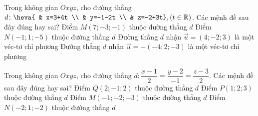 \begin{ex}%
	Trong không gian $Oxyz$, cho đường thẳng $d\colon \heva{
		& x=3+4t \\ 
		& y=-1-2t \\ 
		& z=-2+3t},( t\in \mathbb{R})$. Các mệnh đề sau đây đúng hay sai?
	\choiceTF
	{ Điểm $M\left( 7;-3;-1 \right)$ thuộc đường thẳng $d$}
	{ \True Điểm $N\left( -1;1;-5 \right)$ thuộc đường thẳng $d$}
	{\True  Đường thẳng $d$ nhận $\overrightarrow{u}=\left( 4;-2;3 \right)$ là một véc-tơ chỉ phương}
	{\True  Đường thẳng $d$ nhận $\overrightarrow{u}=-\left( -4;2;-3 \right)$ là một véc-tơ chỉ phương}
\end{ex}
\begin{ex}%
	Trong không gian $Oxyz$, cho đường thẳng $d \colon \dfrac{x-1}{2}=\dfrac{y-2}{-1}=\dfrac{z-3}{2}$. Các mệnh đề sau đây đúng hay sai?
	\choiceTF
	{ Điểm $Q\left( 2;-1;2 \right)$ thuộc đường thẳng $d$}
	{ \True Điểm $P\left( 1;2;3 \right)$ thuộc đường thẳng $d$}
	{ Điểm $M\left( -1;-2;-3 \right)$ thuộc đường thẳng $d$}
	{ Điểm $N\left( -2;1;-2 \right)$ thuộc đường thẳng $d$}
\end{ex}
